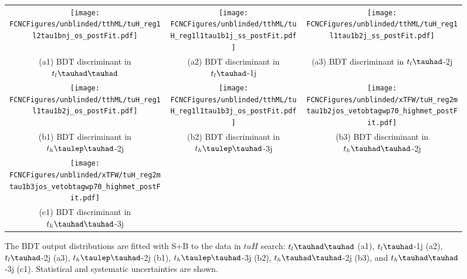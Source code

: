 \begin{figure}[H]
\begin{tabular}{@{}ccc@{}}
\texttt{[image: \\FCNCFigures/unblinded/tthML/tuH\_reg1l2tau1bnj\_os\_postFit.pdf]}&
\texttt{[image: \\FCNCFigures/unblinded/tthML/tuH\_reg1l1tau1b1j\_ss\_postFit.pdf]}&
\texttt{[image: \\FCNCFigures/unblinded/tthML/tuH\_reg1l1tau1b2j\_ss\_postFit.pdf]}\\
(a1) BDT discriminant in $t_l\thadhad$ & (a2) BDT discriminant in  $t_l\tauhad$-1j& (a3) BDT discriminant in $t_l\tauhad$-2j\\
\texttt{[image: \\FCNCFigures/unblinded/tthML/tuH\_reg1l1tau1b2j\_os\_postFit.pdf]}&
\texttt{[image: \\FCNCFigures/unblinded/tthML/tuH\_reg1l1tau1b3j\_os\_postFit.pdf]}&
\texttt{[image: \\FCNCFigures/unblinded/xTFW/tuH\_reg2mtau1b2jos\_vetobtagwp70\_highmet\_postFit.pdf]}\\
(b1) BDT discriminant in $t_h\tlhad$-2j & (b2) BDT discriminant in  $t_h\tlhad$-3j & (b3) BDT discriminant in $t_h\thadhad$-2j \\
\texttt{[image: \\FCNCFigures/unblinded/xTFW/tuH\_reg2mtau1b3jos\_vetobtagwp70\_highmet\_postFit.pdf]}&\\
(c1) BDT discriminant in$t_h\thadhad$-3j\\
\end{tabular}
\caption{ The BDT output distributions are fitted with S+B to the data in $tuH$ search: $t_l\thadhad$ (a1),  $t_l\tauhad$-1j (a2),  $t_l\tauhad$-2j (a3),
  $t_h\tlhad$-2j (b1), $t_h\tlhad$-3j (b2), $t_h\thadhad$-2j (b3), and $t_h\thadhad$-3j (c1). Statistical and systematic uncertainties are shown.}
\label{fig:asimov_postfitbdtHu}
\end{figure}

